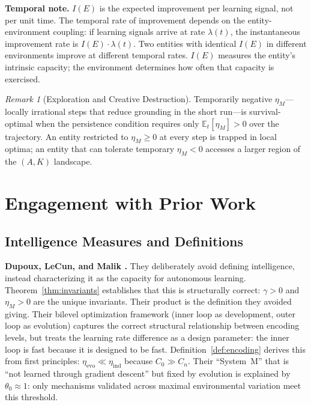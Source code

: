 \documentclass[11pt]{article}
\theoremstyle{definition}
\theoremstyle{remark}
\newtheorem{remark}{Remark}
\begin{document}
\textbf{Temporal note.} $I(E)$ is the expected improvement per learning
signal, not per unit time. The temporal rate of improvement depends on
the entity-environment coupling: if learning signals arrive at rate
$\lambda(t)$, the instantaneous improvement rate is
$I(E) \cdot \lambda(t)$. Two entities with identical $I(E)$ in different
environments improve at different temporal rates. $I(E)$ measures the
entity's intrinsic capacity; the environment determines how often that
capacity is exercised.

\begin{remark}[Exploration and Creative Destruction]
\label{rem:exploration}
Temporarily negative $\eta_M$---locally irrational steps that reduce
grounding in the short run---is survival-optimal when the persistence
condition requires only $\mathbb{E}_t[\eta_M] > 0$ over the trajectory.
An entity restricted to $\eta_M \geq 0$ at every step is trapped in
local optima; an entity that can tolerate temporary $\eta_M < 0$
accesses a larger region of the $(A, K)$ landscape.
\end{remark}

\section{Engagement with Prior Work}
\label{sec:prior}

\subsection{Intelligence Measures and Definitions}

\textbf{Dupoux, LeCun, and Malik \cite{DupouxLeCunMalik2026}.}
They deliberately avoid defining intelligence, instead characterizing
it as the capacity for autonomous learning. Theorem~\ref{thm:invariants}
establishes that this is structurally correct: $\gamma > 0$ and
$\eta_M > 0$ are the unique invariants. Their product is the definition
they avoided giving. Their bilevel optimization framework (inner loop as
development, outer loop as evolution) captures the correct structural
relationship between encoding levels, but treats the learning rate
difference as a design parameter: the inner loop is fast because it is
designed to be fast. Definition~\ref{def:encoding} derives this from
first principles: $\eta_{\mathrm{evo}} \ll \eta_{\mathrm{ind}}$ because
$C_0 \gg C_n$. Their ``System~M'' that is ``not learned through
gradient descent'' but fixed by evolution is explained by
$\theta_0 \approx 1$: only mechanisms validated across maximal
environmental variation meet this threshold.
\end{document}
